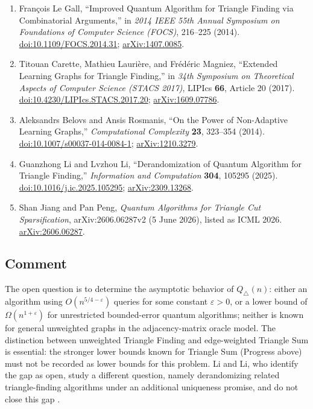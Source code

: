 \begin{enumerate}[label={},leftmargin=4.8em,labelsep=0.5em]
  \footnotesize
  \item[\textup{[LG14]}]\label{ref:0c17-le-gall}
  Fran\c{c}ois Le Gall, ``Improved Quantum Algorithm for Triangle Finding
via Combinatorial Arguments,'' in \emph{2014 IEEE 55th Annual Symposium on
Foundations of Computer Science (FOCS)}, 216--225 (2014).
\href{https://doi.org/10.1109/FOCS.2014.31}{doi:10.1109/FOCS.2014.31};
\href{https://arxiv.org/abs/1407.0085}{arXiv:1407.0085}.

  \item[\textup{[CLM17]}]\label{ref:0c17-carette}
  Titouan Carette, Mathieu Lauri\`ere, and Fr\'ed\'eric Magniez,
``Extended Learning Graphs for Triangle Finding,'' in \emph{34th Symposium on
Theoretical Aspects of Computer Science (STACS 2017)}, LIPIcs
\textbf{66}, Article 20 (2017).
\href{https://doi.org/10.4230/LIPIcs.STACS.2017.20}{doi:10.4230/LIPIcs.STACS.2017.20};
\href{https://arxiv.org/abs/1609.07786}{arXiv:1609.07786}.

  \item[\textup{[BR14]}]\label{ref:0c17-belovs}
  Aleksandrs Belovs and Ansis Rosmanis, ``On the Power of Non-Adaptive
Learning Graphs,'' \emph{Computational Complexity} \textbf{23}, 323--354
(2014).
\href{https://doi.org/10.1007/s00037-014-0084-1}{doi:10.1007/s00037-014-0084-1};
\href{https://arxiv.org/abs/1210.3279}{arXiv:1210.3279}.

  \item[\textup{[LL25]}]\label{ref:0c17-li-li}
  Guanzhong Li and Lvzhou Li, ``Derandomization of Quantum Algorithm for
Triangle Finding,'' \emph{Information and Computation} \textbf{304}, 105295
(2025).
\href{https://doi.org/10.1016/j.ic.2025.105295}{doi:10.1016/j.ic.2025.105295};
\href{https://arxiv.org/abs/2309.13268}{arXiv:2309.13268}.

  \item[\textup{[JP26]}]\label{ref:0c17-jiang-peng}
  Shan Jiang and Pan Peng, \emph{Quantum Algorithms for Triangle Cut Sparsification}, arXiv:2606.06287v2 (5 June 2026), listed as ICML 2026. \href{https://arxiv.org/abs/2606.06287}{arXiv:2606.06287}.
\end{enumerate}

\subsection*{Comment}

The open question is to determine the asymptotic behavior of
$Q_{\triangle}(n)$: either an algorithm using $O(n^{5/4-\varepsilon})$
queries for some constant $\varepsilon>0$, or a lower bound of
$\Omega(n^{1+\varepsilon})$ for unrestricted bounded-error quantum
algorithms; neither is known for general unweighted graphs in the
adjacency-matrix oracle model.  The distinction between unweighted Triangle
Finding and edge-weighted Triangle Sum is essential: the stronger lower
bounds known for Triangle Sum (Progress above) must not be recorded as lower
bounds for this problem.  Li and Li, who identify the gap as open, study a
different question, namely derandomizing related triangle-finding algorithms
under an additional uniqueness promise, and do not close this gap
.

